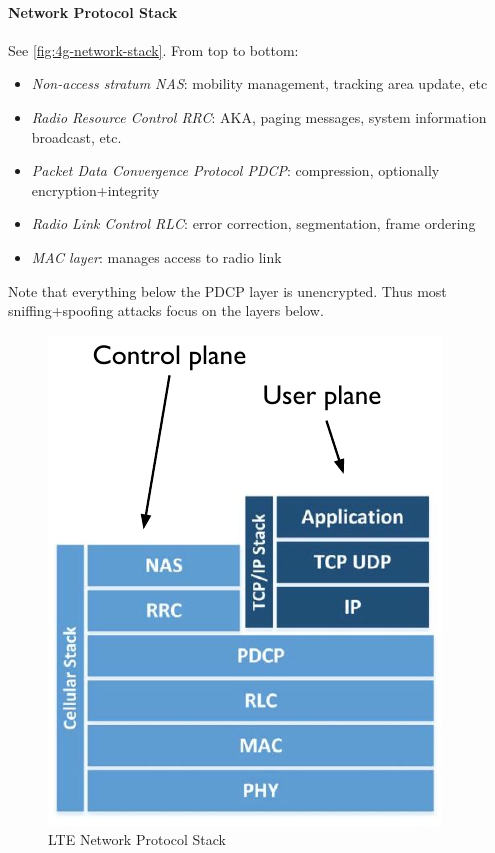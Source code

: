 \paragraph{Network Protocol Stack}
See \autoref{fig:4g-network-stack}. From top to bottom:
\begin{itemize}
	\item \textit{Non-access stratum NAS}: mobility management, tracking area update, etc
	\item \textit{Radio Resource Control RRC}: AKA, paging messages, system information broadcast, etc.
	\item \textit{Packet Data Convergence Protocol PDCP}: compression, optionally encryption+integrity
	\item \textit{Radio Link Control RLC}: error correction, segmentation, frame ordering
	\item \textit{MAC layer}: manages access to radio link
\end{itemize}
Note that everything below the PDCP layer is unencrypted.
Thus most sniffing+spoofing attacks focus on the layers below.

\begin{figure}
	\centering
	\includegraphics[scale=0.5]{images/10-4g-network-stack.png}
	\caption{LTE Network Protocol Stack}
	\label{fig:4g-network-stack}
\end{figure}

